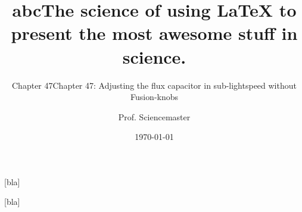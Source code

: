 \documentclass[presentation,english]{beamer}
\title[Scientific LaTeX]{abc}
\author{Prof. Sciencemaster}
\subtitle{Chapter 47}
\date{\today}
\begin{document}
[bla]
\begin{frame}
  \titlepage
\end{frame}

\title[Scientific LaTeX]{The science of using LaTeX to present the most awesome stuff in science.}
\subtitle{Chapter 47: Adjusting the flux capacitor in sub-lightspeed without Fusion-knobs}
[bla]
\begin{frame}
    \titlepage
\end{frame}
\end{document}

